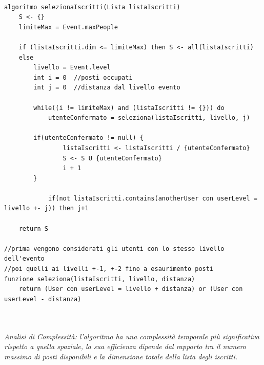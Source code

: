 \\
\begin{lstlisting}
algoritmo selezionaIscritti(Lista listaIscritti) 
    S <- {}
    limiteMax = Event.maxPeople
    
    if (listaIscritti.dim <= limiteMax) then S <- all(listaIscritti)
    else 
        livello = Event.level
        int i = 0  //posti occupati
        int j = 0  //distanza dal livello evento
        
        while((i != limiteMax) and (listaIscritti != {})) do
            utenteConfermato = seleziona(listaIscritti, livello, j)
            
	    if(utenteConfermato != null) {
            	listaIscritti <- listaIscritti / {utenteConfermato}
            	S <- S U {utenteConfermato}
            	i + 1
	    }

            if(not listaIscritti.contains(anotherUser con userLevel = livello +- j)) then j+1
        
    return S

//prima vengono considerati gli utenti con lo stesso livello dell'evento
//poi quelli ai livelli +-1, +-2 fino a esaurimento posti
funzione seleziona(listaIscritti, livello, distanza)
    return (User con userLevel = livello + distanza) or (User con userLevel - distanza)
\end{lstlisting}
\\
\\
\textit{Analisi di Complessità: l'algoritmo ha una complessità temporale più significativa rispetto a quella spaziale, la sua efficienza dipende dal rapporto tra il numero massimo di posti disponibili e la dimensione totale della lista degli iscritti.}
